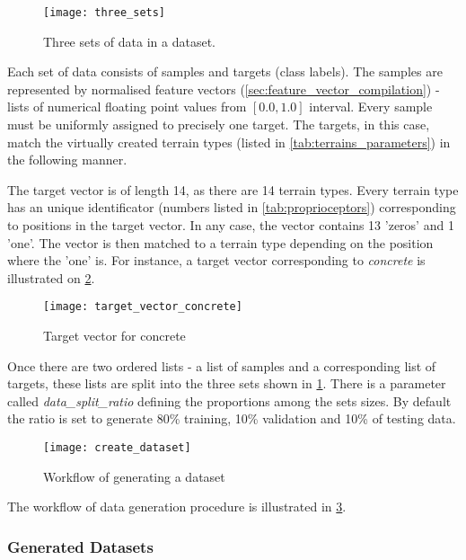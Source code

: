 \begin{figure}[H]
  \centering
  \texttt{[image: three\_sets]}
  \caption{Three sets of data in a dataset.}
  \label{img:three_sets}
\end{figure}

Each set of data consists of samples and targets (class labels). The samples are represented by normalised feature vectors (\cref{sec:feature_vector_compilation}) - lists of numerical floating point values from $ [0.0, 1.0] $ interval. Every sample must be uniformly assigned to precisely one target. The targets, in this case, match the virtually created terrain types (listed in \cref{tab:terrains_parameters}) in the following manner.

The target vector is of length 14, as there are 14 terrain types. Every terrain type has an unique identificator (numbers listed in \cref{tab:proprioceptors}) corresponding to positions in the target vector. In any case, the vector contains 13 'zeros' and 1 'one'. The vector is then matched to a terrain type depending on the position where the 'one' is. For instance, a target vector corresponding to \textit{concrete} is illustrated on \cref{img:target_vector_concrete}.

\begin{figure}[H]
  \centering
  \texttt{[image: target\_vector\_concrete]}
  \caption{Target vector for concrete}
  \label{img:target_vector_concrete}
\end{figure}

Once there are two ordered lists - a list of samples and a corresponding list of targets, these lists are split into the three sets shown in \cref{img:three_sets}. There is a parameter called \textit{data\_split\_ratio} defining the proportions among the sets sizes. By default the ratio is set to generate 80\% training, 10\% validation and 10\% of testing data.

\begin{figure}[H]
  \centering
  \texttt{[image: create\_dataset]}
  \caption{Workflow of generating a dataset}
  \label{img:create_dataset}
\end{figure}

The workflow of data generation procedure is illustrated in \cref{img:create_dataset}. 

\subsubsection*{Generated Datasets} \label{sssec:generated_datasets}

